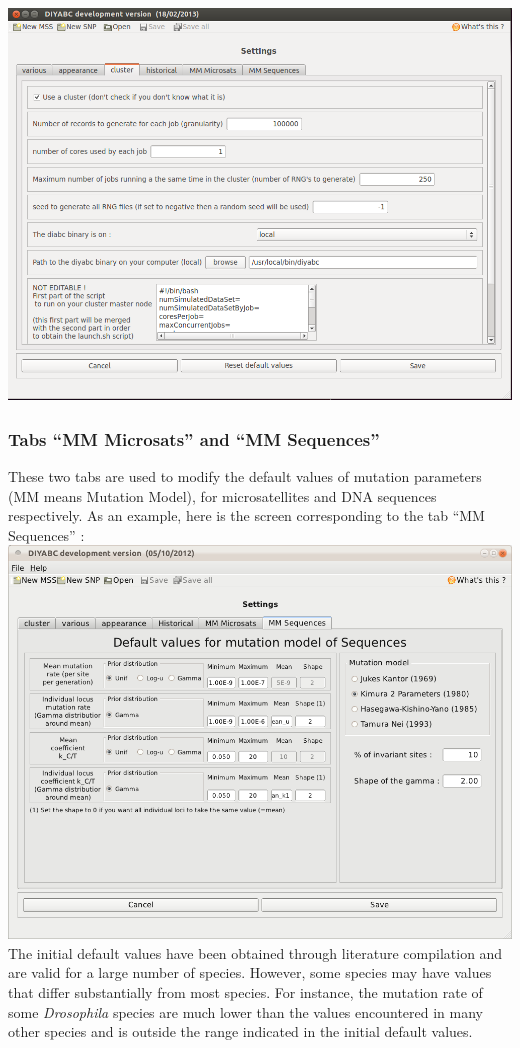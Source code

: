 \includegraphics[scale=0.33]{gui_pictures/Capture-DIYABC-cluster.png} \\

\subsubsection{Tabs \textsf{``MM Microsats''} and \textsf{``MM Sequences''}}

These two tabs are used to modify the default values of mutation parameters (MM means Mutation Model), for microsatellites and DNA sequences respectively. As an example, here is the screen corresponding to the tab  \textsf{``MM Sequences''} : \\

\includegraphics[scale=0.33]{gui_pictures/Capture-DIYABC-102.png} \\

The initial default values have been obtained through literature compilation and are valid for a large number of species. However, some species may have values that differ substantially from most species. For instance, the mutation rate of some \emph{Drosophila} species are much lower than the values encountered in many other species \citep{SMA1997,VPAD2000} and is outside the range indicated in the initial default values. 



 
